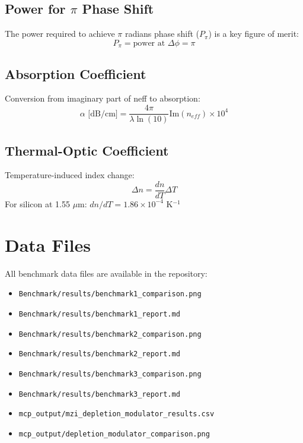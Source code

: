 \documentclass[11pt,a4paper]{article}
\begin{document}
\subsection{Power for $\pi$ Phase Shift}
The power required to achieve $\pi$ radians phase shift ($P_\pi$) is a key figure of merit:
\begin{equation}
P_\pi = \text{power at } \Delta\phi = \pi
\end{equation}

\subsection{Absorption Coefficient}
Conversion from imaginary part of neff to absorption:
\begin{equation}
\alpha \text{ [dB/cm]} = \frac{4\pi}{\lambda \ln(10)} \text{Im}(n_{eff}) \times 10^4
\end{equation}

\subsection{Thermal-Optic Coefficient}
Temperature-induced index change:
\begin{equation}
\Delta n = \frac{dn}{dT} \Delta T
\end{equation}
For silicon at 1.55 $\mu$m: $dn/dT = 1.86 \times 10^{-4}$ K$^{-1}$

\section{Data Files}
All benchmark data files are available in the repository:
\begin{itemize}
    \item \texttt{Benchmark/results/benchmark1\_comparison.png}
    \item \texttt{Benchmark/results/benchmark1\_report.md}
    \item \texttt{Benchmark/results/benchmark2\_comparison.png}
    \item \texttt{Benchmark/results/benchmark2\_report.md}
    \item \texttt{Benchmark/results/benchmark3\_comparison.png}
    \item \texttt{Benchmark/results/benchmark3\_report.md}
    \item \texttt{mcp\_output/mzi\_depletion\_modulator\_results.csv}
    \item \texttt{mcp\_output/depletion\_modulator\_comparison.png}
\end{itemize}
\end{document}
